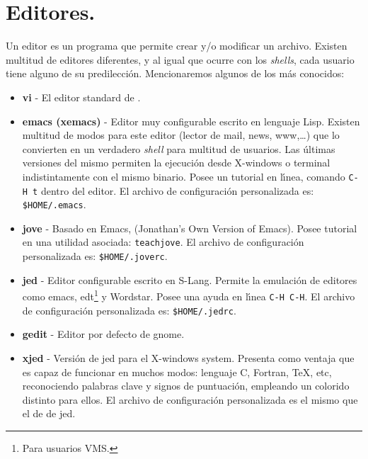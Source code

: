 \section{Editores.}

Un editor es un programa que permite crear y/o modificar un archivo.
Existen multitud de editores diferentes, y al igual que ocurre con los
{\it shells}, cada usuario tiene alguno de su predilecci{\'o}n. Mencionaremos
algunos de los m{\'a}s conocidos:

\begin{itemize}

\item {\bf vi} - El editor standard de {\unix}.
  
\item {\bf emacs (xemacs)} - Editor muy configurable escrito en
  lenguaje Lisp.  Existen multitud de modos para este editor (lector
  de mail, news, www,\ldots) que lo convierten en un verdadero {\it
    shell} para multitud de usuarios. Las {\'u}ltimas versiones del mismo
  permiten la ejecuci{\'o}n desde X-windows o terminal indistintamente con
  el mismo binario.  Posee un tutorial en l{\'\i}nea, comando \verb+C-H t+
  dentro del editor. El archivo de configuraci{\'o}n personalizada es:
  {\tt \$HOME/.emacs}.
  
\item {\bf jove} - Basado en Emacs, (Jonathan's Own Version of Emacs).
  Posee tutorial en una utilidad asociada: \verb+teachjove+. El
  archivo de configuraci{\'o}n personalizada es: {\tt \$HOME/.joverc}.
  
\item {\bf jed} - Editor configurable escrito en S-Lang.  Permite la
  emulaci{\'o}n de editores como emacs, edt\footnote{Para usuarios VMS.} y
  Wordstar.  Posee una ayuda en l{\'\i}nea \verb+C-H C-H+.  El archivo de
  configuraci{\'o}n personalizada es: {\tt \$HOME/.jedrc}.

\item {\bf gedit} - Editor por defecto de gnome.
  
\item {\bf xjed} - Versi{\'o}n de jed para el {X-windows system}.  Presenta
  como ventaja que es capaz de funcionar en muchos modos: lenguaje C,
  Fortran, TeX, etc, reconociendo palabras clave y signos de
  puntuaci{\'o}n, empleando un colorido distinto para ellos. El archivo de
  configuraci{\'o}n personalizada es el mismo que el de de jed.

\end{itemize}

